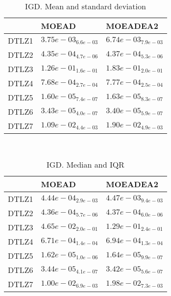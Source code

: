 \documentclass{article}
\begin{document}
\
\begin{table}
\caption{IGD. Mean and standard deviation}
\label{table:mean.IGD}
\centering
\begin{scriptsize}
\begin{tabular}{lll}
\hline & MOEAD &  MOEADEA2\\
\hline
DTLZ1 & \cellcolor{gray95}$  3.75e-03_{ 6.6e-03}$ & $  6.74e-03_{ 7.9e-03}$ \\
DTLZ2 & \cellcolor{gray95}$  4.35e-04_{ 4.7e-06}$ & $  4.37e-04_{ 5.3e-06}$ \\
DTLZ3 & \cellcolor{gray95}$  1.26e-01_{ 1.6e-01}$ & $  1.83e-01_{ 2.0e-01}$ \\
DTLZ4 & \cellcolor{gray95}$  7.68e-04_{ 2.7e-04}$ & $  7.77e-04_{ 2.5e-04}$ \\
DTLZ5 & \cellcolor{gray95}$  1.60e-05_{ 7.4e-07}$ & $  1.63e-05_{ 8.3e-07}$ \\
DTLZ6 & \cellcolor{gray25}$  3.43e-05_{ 4.0e-07}$ & \cellcolor{gray95}$  3.40e-05_{ 5.9e-07}$ \\
DTLZ7 & \cellcolor{gray95}$  1.09e-02_{ 4.4e-03}$ & $  1.90e-02_{ 4.9e-03}$ \\
\hline
\end{tabular}
\end{scriptsize}
\end{table}
\
\begin{table}
\caption{IGD. Median and IQR}
\label{table:median.IGD}
\begin{scriptsize}
\centering
\begin{tabular}{lll}
\hline & MOEAD &  MOEADEA2\\
\hline
DTLZ1 & \cellcolor{gray95}$  4.44e-04_{ 2.9e-03}$ & $  4.47e-03_{ 9.4e-03}$ \\
DTLZ2 & \cellcolor{gray95}$  4.36e-04_{ 5.7e-06}$ & $  4.37e-04_{ 6.0e-06}$ \\
DTLZ3 & \cellcolor{gray95}$  4.65e-02_{ 2.0e-01}$ & $  1.29e-01_{ 2.4e-01}$ \\
DTLZ4 & \cellcolor{gray95}$  6.71e-04_{ 1.4e-04}$ & $  6.94e-04_{ 1.3e-04}$ \\
DTLZ5 & \cellcolor{gray95}$  1.62e-05_{ 1.0e-06}$ & $  1.64e-05_{ 9.9e-07}$ \\
DTLZ6 & \cellcolor{gray25}$  3.44e-05_{ 4.1e-07}$ & \cellcolor{gray95}$  3.42e-05_{ 5.6e-07}$ \\
DTLZ7 & \cellcolor{gray95}$  1.00e-02_{ 6.9e-03}$ & $  1.98e-02_{ 7.3e-03}$ \\
\hline
\end{tabular}
\end{scriptsize}
\end{table}
\end{document}
